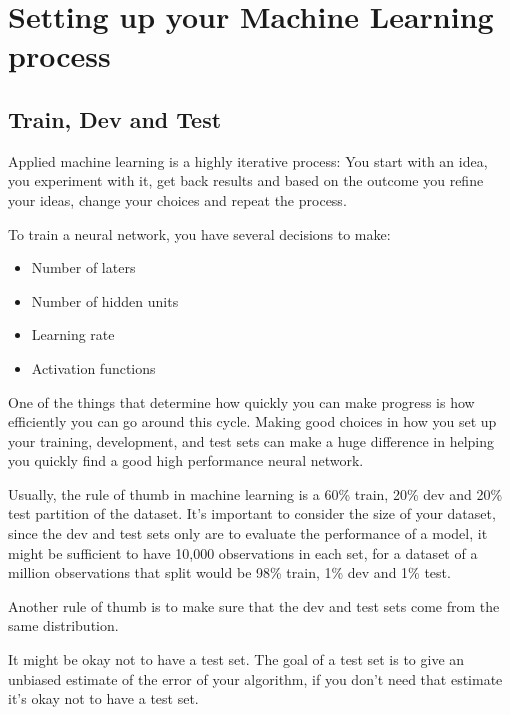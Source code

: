 




\section*{Setting up your Machine Learning process}
\subsection*{Train, Dev and Test}

Applied machine learning is a highly iterative process: You start with an idea, you 
experiment with it, get back results and based on the outcome you refine your ideas,
change your choices and repeat the process.

To train a neural network, you have several decisions to make:

\begin{itemize}
    \item Number of laters
    \item Number of hidden units
    \item Learning rate
    \item Activation functions
\end{itemize}

One of the things that determine how quickly you can make progress is how efficiently 
you can go around this cycle. Making good choices in how you set up your training, development, and test sets can make
a huge difference in helping you quickly find a good high performance neural network.

Usually, the rule of thumb in machine learning is a 60\% train, 20\% dev and 20\% test 
partition of the dataset. It's important to consider the size of your dataset, since the
dev and test sets only are to evaluate the performance of a model, it might be 
sufficient to have 10,000 observations in each set, for a dataset of a million observations
that split would be 98\% train, 1\% dev and 1\% test.

Another rule of thumb is to make sure that the dev and test sets come from the same 
distribution.

It might be okay not to have a test set. The goal of a test set is to give an 
unbiased estimate of the error of your algorithm, if you don't need that estimate it's
okay not to have a test set.

